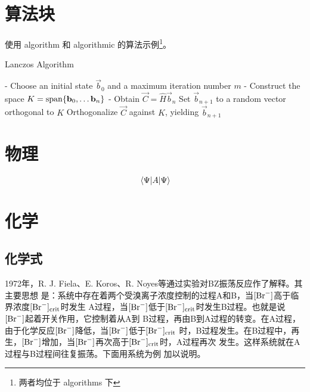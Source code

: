 \section{算法块}

使用 {algorithm} 和 {algorithmic} 的算法示例\footnote{两者均位于 \textsf{algorithms} 下}。

\begin{algorithm}[htbp]
    \caption{Lanczos Algorithm}
    \begin{algorithmic}
        \STATE - Choose an initial state $\vec{b}_0$ and a maximum iteration number $m$
        \STATE - Construct the space $K = \operatorname{span}\{\mathbf{b}_0 , \ldots \mathbf{b}_n \}$
        \STATE - Obtain $\vec{C} = \hat{H} \vec{b}_n$
        \STATE Set $\vec{b}_{n+1}$ to a random vector orthogonal to $K$
        \ELSE
        \STATE Orthogonalize $\vec{C}$ against $K$, yielding $\vec{b}_{n+1}$
        \ENDIF\ENDFOR
    \end{algorithmic}
\end{algorithm}


\section{物理}

\begin{equation}
    \expval{A}{\Psi}
\end{equation}


\section{化学}

\subsection{化学式}

1972年，R. J. Fiela、E. Koros、R. Noyes等通过实验对BZ振荡反应作了解释。其主要思想
是：系统中存在着两个受溴离子浓度控制的过程A和B，当$[\ce{Br-}]$高于临界浓度$[\ce{Br-}]_\text{crit}$时发生
A过程，当$[\ce{Br-}]$低于$[\ce{Br-}]_\text{crit}$时发生B过程。也就是说$[\ce{Br-}]$起着开关作用，它控制着从A到
B过程，再由B到A过程的转变。在A过程，由于化学反应$[\ce{Br-}]$降低，当$[\ce{Br-}]$低于$[\ce{Br-}]_\text{crit}$
时，B过程发生。在B过程中，再生，$[\ce{Br-}]$增加，当$[\ce{Br-}]$再次高于$[\ce{Br-}]_\text{crit}$时，A过程再次
发生。这样系统就在A过程与B过程间往复振荡。下面用系统为例
加以说明。%

